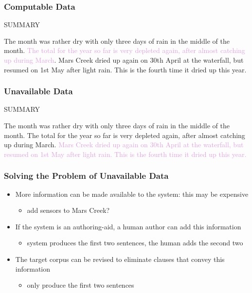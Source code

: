 \documentclass[compress,color=usenames]{beamer}
\newcommand{\mH}[1]{\textcolor{Plum}{#1}}
\begin{document}
\begin{frame}
\frametitle{Computable Data}

SUMMARY

The month was rather dry with only three days of rain in the middle of the month. \mH{The total for the year so far is very depleted again, after almost catching up during March}. Mars Creek dried up again on 30th April at the waterfall, but resumed on 1st May after light rain. This is the fourth time it dried up this year.

\end{frame}

\begin{frame}
\frametitle{Unavailable Data}

SUMMARY

The month was rather dry with only three days of rain in the middle of the month. The total for the year so far is very depleted again, after almost catching up during March. \mH{Mars Creek dried up again on 30th April at the waterfall, but resumed on 1st May after light rain. This is the fourth time it dried up this year.}

\end{frame}


\begin{frame}
\frametitle{Solving the Problem of Unavailable Data}

\begin{itemize}
\item { {More information can be made available to the system: this may be expensive}}
    \begin{itemize}
        \item add sensors to Mars Creek?
    \end{itemize}
\item { {If the system is an authoring-aid, a human author can add this information}}
    \begin{itemize}
    \item system produces the first two sentences, the human adds the second two
    \end{itemize}
\item { {The target corpus can be revised to eliminate clauses that convey this information}}
    \begin{itemize}
    \item only produce the first two sentences
    \end{itemize}
\end{itemize}

\end{frame}
\end{document}

